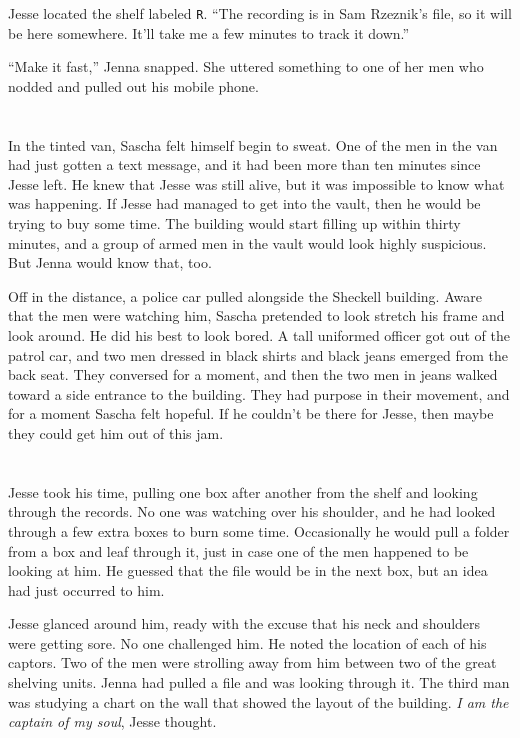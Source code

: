 \documentclass[12pt]{book}
\begin{document}
Jesse located the shelf labeled \texttt{R}.  ``The recording is in Sam Rzeznik's file, so it will be here somewhere.  It'll take me a few minutes to track it down.''

``Make it fast,'' Jenna snapped.  She uttered something to one of her men who nodded and pulled out his mobile phone.

\chapter{}

In the tinted van, Sascha felt himself begin to sweat.  One of the men in the van had just gotten a text message, and it had been more than ten minutes since Jesse left.  He knew that Jesse was still alive, but it was impossible to know what was happening.  If Jesse had managed to get into the vault, then he would be trying to buy some time.  The building would start filling up within thirty minutes, and a group of armed men in the vault would look highly suspicious.  But Jenna would know that, too.

Off in the distance, a police car pulled alongside the Sheckell building.  Aware that the men were watching him, Sascha pretended to look stretch his frame and look around.  He did his best to look bored.  A tall uniformed officer got out of the patrol car, and two men dressed in black shirts and black jeans emerged from the back seat.  They conversed for a moment, and then the two men in jeans walked toward a side entrance to the building.  They had purpose in their movement, and for a moment Sascha felt hopeful.  If he couldn't be there for Jesse, then maybe they could get him out of this jam.

\chapter{}

Jesse took his time, pulling one box after another from the shelf and looking through the records.  No one was watching over his shoulder, and he had looked through a few extra boxes to burn some time.  Occasionally he would pull a folder from a box and leaf through it, just in case one of the men happened to be looking at him.  He guessed that the file would be in the next box, but an idea had just occurred to him.

Jesse glanced around him, ready with the excuse that his neck and shoulders were getting sore.  No one challenged him.  He noted the location of each of his captors.  Two of the men were strolling away from him between two of the great shelving units.  Jenna had pulled a file and was looking through it.  The third man was studying a chart on the wall that showed the layout of the building.  \emph{I am the captain of my soul}, Jesse thought.
\end{document}
